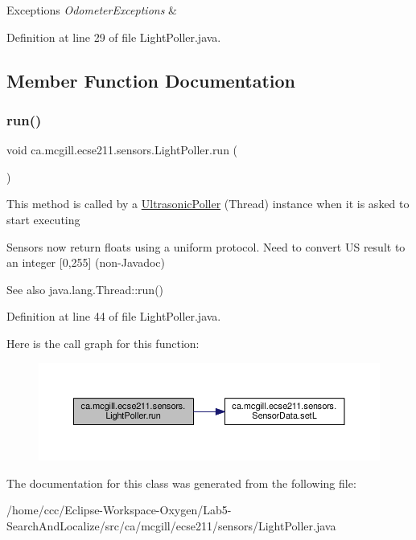 \begin{DoxyExceptions}{Exceptions}
{\em Odometer\+Exceptions} & \\
\hline
\end{DoxyExceptions}


Definition at line 29 of file Light\+Poller.\+java.



\subsection{Member Function Documentation}
\mbox{\label{classca_1_1mcgill_1_1ecse211_1_1sensors_1_1_light_poller_a31751b40132d9402de493aa9ec11d9d5}} 
\subsubsection{\texorpdfstring{run()}{run()}}
{\footnotesize\ttfamily void ca.\+mcgill.\+ecse211.\+sensors.\+Light\+Poller.\+run (\begin{DoxyParamCaption}{ }\end{DoxyParamCaption})}

This method is called by a \hyperlink{classca_1_1mcgill_1_1ecse211_1_1sensors_1_1_ultrasonic_poller}{Ultrasonic\+Poller} (Thread) instance when it is asked to start executing

Sensors now return floats using a uniform protocol. Need to convert US result to an integer \mbox{[}0,255\mbox{]} (non-\/\+Javadoc)

\begin{DoxySeeAlso}{See also}
java.\+lang.\+Thread\+::run() 
\end{DoxySeeAlso}


Definition at line 44 of file Light\+Poller.\+java.

Here is the call graph for this function\+:\nopagebreak
\begin{figure}[H]
\begin{center}
\leavevmode
\includegraphics[width=350pt]{classca_1_1mcgill_1_1ecse211_1_1sensors_1_1_light_poller_a31751b40132d9402de493aa9ec11d9d5_cgraph}
\end{center}
\end{figure}


The documentation for this class was generated from the following file\+:\begin{DoxyCompactItemize}
\item 
/home/ccc/\+Eclipse-\/\+Workspace-\/\+Oxygen/\+Lab5-\/\+Search\+And\+Localize/src/ca/mcgill/ecse211/sensors/Light\+Poller.\+java\end{DoxyCompactItemize}
